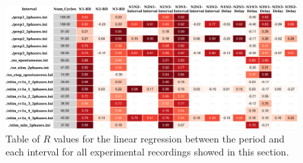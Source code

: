 \begin{figure}
	\includegraphics[width=\textwidth]{./invariants/styled_table_invariants_r-value.pdf}
	\caption{Table of $R$ values for the linear regression between the period and each interval for all experimental recordings showed in this section.}
	\label{fig:R table}
\end{figure}



